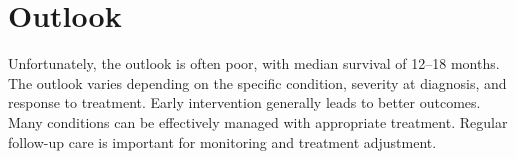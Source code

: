 \section{Outlook}
Unfortunately, the outlook is often poor, with median survival of 12--18 months. The outlook varies depending on the specific condition, severity at diagnosis, and response to treatment. Early intervention generally leads to better outcomes. Many conditions can be effectively managed with appropriate treatment. Regular follow-up care is important for monitoring and treatment adjustment.
